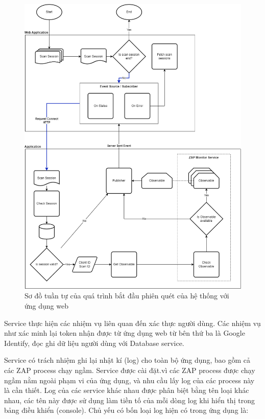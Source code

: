 \begin{figure}[H]
      \centering
      \includegraphics[width=\textwidth]{applied-thesis-chapters/chapter-3/Sơ đồ tuần tự của quá trình bắt đầu phiên quét của hệ thống với ứng dụng web.png}
      \caption{Sơ đồ tuần tự của quá trình bắt đầu phiên quét của hệ thống với ứng dụng web}
      \label{fig:TTHeThongStartScan}
\end{figure}

\tab \tab Service thực hiện các nhiệm vụ liên quan đến xác thực người dùng.
Các nhiệm vụ như xác minh lại token nhận được từ ứng dụng web từ bên thứ ba là Google Identify, đọc ghi dữ liệu người dùng với Database service.

\tab \tab Service có trách nhiệm ghi lại nhật kí (log) cho toàn bộ ứng dụng, bao gồm cả các ZAP process chạy ngầm.
Service được cài đặt.vì các ZAP process được chạy ngầm nằm ngoài phạm vi của ứng dụng, và nhu cầu lấy log của các process này là cần thiết.
Log của các service khác nhau được phân biệt bằng tên loại khác nhau, các tên này được sử dụng làm tiền tố của mỗi dòng log khi hiển thị trong bảng điều khiển (console).
Chủ yếu có bốn loại log hiện có trong ứng dụng là:

